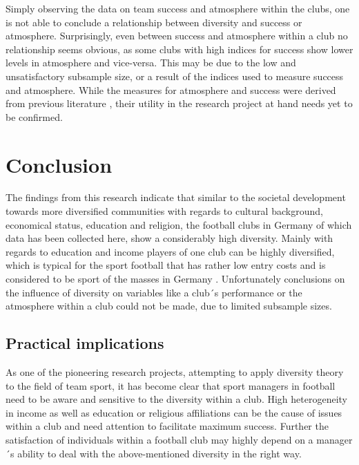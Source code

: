 \documentclass[	
	12pt, %
	a4paper, %
]{scrartcl}\usepackage[]{graphicx}\usepackage[]{color}
\begin{document}
Simply observing the data on team success and atmosphere within the clubs, one is not able to conclude a relationship between diversity and success or atmosphere. Surprisingly, even between success and atmosphere within a club no relationship seems obvious, as some clubs with high indices for success show lower levels in atmosphere and vice-versa. This may be due to the low and unsatisfactory subsample size, or a result of the indices used to measure success and atmosphere. While the measures for atmosphere and success were derived from previous literature \cite{Basadur2001, Timmerman2000}, their utility in the research project at hand needs yet to be confirmed.


\section{Conclusion}
\label{sec:conclusion}
The findings from this research indicate that similar to the societal development towards more diversified communities with regards to cultural background, economical status, education and religion, the football clubs in Germany of which data has been collected here, show a considerably high diversity. Mainly with regards to education and income players of one club can be highly diversified, which is typical for the sport football that has rather low entry costs and is considered to be sport of the masses in Germany \cite{Breuer2010}. Unfortunately conclusions on the influence of diversity on variables like a club´s performance or the atmosphere within a club could not be made, due to limited subsample sizes.
\subsection{Practical implications}
As one of the pioneering research projects, attempting to apply diversity theory to the field of team sport, it has become clear that sport managers in football need to be aware and sensitive to the diversity within a club. High heterogeneity in income as well as education or religious affiliations can be the cause of issues within a club and need attention to facilitate maximum success. Further the satisfaction of individuals within a football club may highly depend on a manager´s ability to deal with the above-mentioned diversity in the right way.
\end{document}
